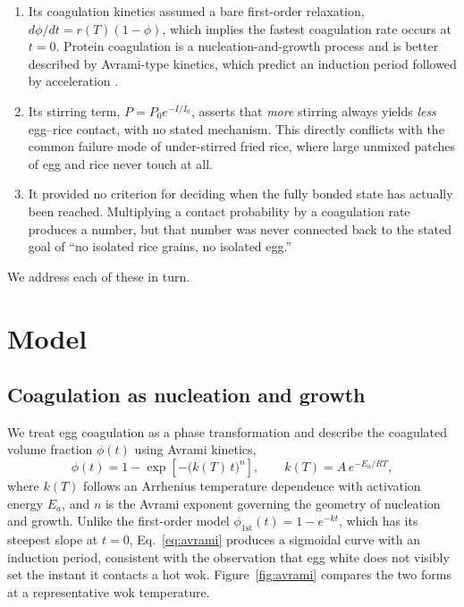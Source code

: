 \documentclass[11pt]{article}
\begin{document}
\begin{enumerate}
    \item Its coagulation kinetics assumed a bare first-order relaxation, $d\phi/dt = r(T)(1-\phi)$, which implies the fastest coagulation rate occurs at $t=0$. Protein coagulation is a nucleation-and-growth process and is better described by Avrami-type kinetics, which predict an induction period followed by acceleration \cite{avrami1939}.
    \item Its stirring term, $P = P_0 e^{-I/I_0}$, asserts that \emph{more} stirring always yields \emph{less} egg--rice contact, with no stated mechanism. This directly conflicts with the common failure mode of under-stirred fried rice, where large unmixed patches of egg and rice never touch at all.
    \item It provided no criterion for deciding when the fully bonded state has actually been reached. Multiplying a contact probability by a coagulation rate produces a number, but that number was never connected back to the stated goal of ``no isolated rice grains, no isolated egg.''
\end{enumerate}

We address each of these in turn.

\section{Model}

\subsection{Coagulation as nucleation and growth}

We treat egg coagulation as a phase transformation and describe the coagulated volume fraction $\phi(t)$ using Avrami kinetics,
\begin{equation}
    \phi(t) = 1 - \exp\!\left[-\big(k(T)\,t\big)^n\right], \qquad k(T) = A\, e^{-E_a / R T},
    \label{eq:avrami}
\end{equation}
where $k(T)$ follows an Arrhenius temperature dependence with activation energy $E_a$, and $n$ is the Avrami exponent governing the geometry of nucleation and growth. Unlike the first-order model $\phi_{\text{1st}}(t) = 1 - e^{-k t}$, which has its steepest slope at $t = 0$, Eq.~\eqref{eq:avrami} produces a sigmoidal curve with an induction period, consistent with the observation that egg white does not visibly set the instant it contacts a hot wok. Figure~\ref{fig:avrami} compares the two forms at a representative wok temperature.
\end{document}
